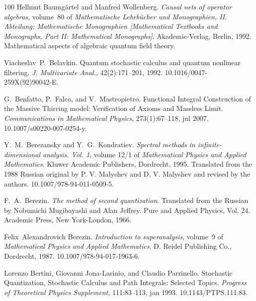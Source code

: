 \documentclass{article}
\newcommand{\tmtextit}[1]{{\itshape{#1}}}
\begin{document}
\begin{thebibliography}{100}
  Hellmut Baumg{\"a}rtel  and  Manfred Wollenberg.
  {\newblock}\tmtextit{Causal nets of operator algebras},  volume~80  of
  \tmtextit{Mathematische Lehrb{\"u}cher und Monographien, II. Abteilung:
  Mathematische Monographien [Mathematical Textbooks and Monographs, Part II:
  Mathematical Monographs]}. {\newblock}Akademie-Verlag, Berlin, 1992.
  {\newblock}Mathematical aspects of algebraic quantum field
  theory.{\newblock}
  
  Viacheslav~P.~Belavkin. {\newblock}Quantum stochastic
  calculus and quantum nonlinear filtering. {\newblock}\tmtextit{J.
  Multivariate Anal.}, 42(2):171--201, 1992.
  {\newblock}\href{Https://doi.org/10.1016/0047-259X(92)90042-E}{}10.1016/0047-259X(92)90042-E.{\newblock}
  
  G.~Benfatto, P.~Falco, and 
  V.~Mastropietro. {\newblock}Functional Integral Construction of the Massive
  Thirring model: Verification of Axioms and Massless Limit.
  {\newblock}\tmtextit{Communications in Mathematical Physics},
  273(1):67--118, jul 2007.
  {\newblock}\href{Https://doi.org/10.1007/s00220-007-0254-y}{}10.1007/s00220-007-0254-y.{\newblock}
  
  Y.~M.~Berezansky  and  Y.~G.~Kondratiev.
  {\newblock}\tmtextit{Spectral methods in infinite-dimensional analysis. Vol.
  1},  volume  12/1  of \tmtextit{Mathematical Physics and Applied
  Mathematics}. {\newblock}Kluwer Academic Publishers, Dordrecht, 1995.
  {\newblock}Translated from the 1988 Russian original by P. V. Malyshev and
  D. V. Malyshev and revised by the authors.
  \href{https://doi.org/10.1007/978-94-011-0509-5}{}10.1007/978-94-011-0509-5.{\newblock}
  
  F.~A.~Berezin. {\newblock}\tmtextit{The method of
  second quantization}. {\newblock}Translated from the Russian by Nobumichi
  Mugibayashi and Alan Jeffrey. Pure and Applied Physics, Vol. 24. Academic
  Press, New York-London, 1966.{\newblock}
  
  Felix~Alexandrovich Berezin.
  {\newblock}\tmtextit{Introduction to superanalysis},  volume~9  of
  \tmtextit{Mathematical Physics and Applied Mathematics}. {\newblock}D.
  Reidel Publishing Co., Dordrecht, 1987.
  {\newblock}\href{Https://doi.org/10.1007/978-94-017-1963-6}{}10.1007/978-94-017-1963-6.{\newblock}
  
  Lorenzo Bertini, Giovanni Jona-Lasinio,
  and  Claudio Parrinello. {\newblock}Stochastic Quantization, Stochastic
  Calculus and Path Integrals: Selected Topics. {\newblock}\tmtextit{Progress
  of Theoretical Physics Supplement}, 111:83--113, jan 1993.
  {\newblock}\href{Https://doi.org/10.1143/PTPS.111.83}{}10.1143/PTPS.111.83.{\newblock}
  

\end{thebibliography}
\end{document}
